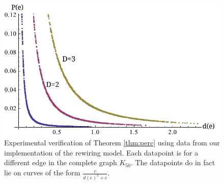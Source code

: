 \documentclass[a4paper,10pt]{article}
\begin{document}
\begin{figure}
 \centering
 \includegraphics{images/edge_existence2.pdf}
 \caption{Experimental verification of Theorem \ref{thm:perc} using data from our implementation of the rewiring model. Each datapoint is for a different edge in the complete graph $K_{50}$. The datapoints do in fact lie on curves of the form $\frac{c}{d(e)^2 + c}$.}
\end{figure}
\end{document}
